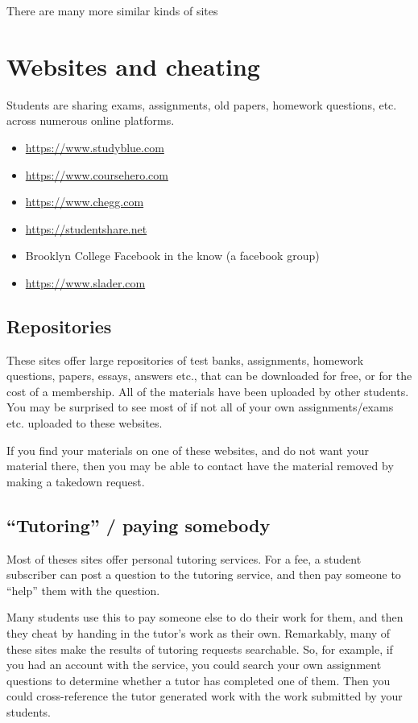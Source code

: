 \documentclass[]{book}
\providecommand{\tightlist}{%
  \setlength{\itemsep}{0pt}\setlength{\parskip}{0pt}}
\theoremstyle{definition}
\theoremstyle{definition}
\theoremstyle{definition}
\theoremstyle{remark}
\begin{document}
There are many more similar kinds of sites

\chapter{Websites and cheating}\label{websites-and-cheating}

Students are sharing exams, assignments, old papers, homework questions,
etc. across numerous online platforms.

\begin{itemize}
\tightlist
\item
  \url{https://www.studyblue.com}
\item
  \url{https://www.coursehero.com}
\item
  \url{https://www.chegg.com}
\item
  \url{https://studentshare.net}
\item
  Brooklyn College Facebook in the know (a facebook group)
\item
  \url{https://www.slader.com}
\end{itemize}

\section{Repositories}\label{repositories}

These sites offer large repositories of test banks, assignments,
homework questions, papers, essays, answers etc., that can be downloaded
for free, or for the cost of a membership. All of the materials have
been uploaded by other students. You may be surprised to see most of if
not all of your own assignments/exams etc. uploaded to these websites.

If you find your materials on one of these websites, and do not want
your material there, then you may be able to contact have the material
removed by making a takedown request.

\section{\texorpdfstring{``Tutoring'' / paying
somebody}{Tutoring / paying somebody}}\label{tutoring-paying-somebody}

Most of theses sites offer personal tutoring services. For a fee, a
student subscriber can post a question to the tutoring service, and then
pay someone to ``help'' them with the question.

Many students use this to pay someone else to do their work for them,
and then they cheat by handing in the tutor's work as their own.
Remarkably, many of these sites make the results of tutoring requests
searchable. So, for example, if you had an account with the service, you
could search your own assignment questions to determine whether a tutor
has completed one of them. Then you could cross-reference the tutor
generated work with the work submitted by your students.
\end{document}
